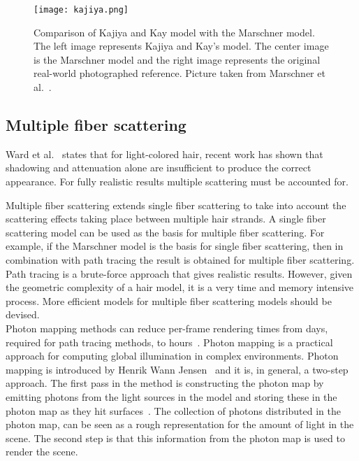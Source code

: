 \documentclass[11pt,a4paper]{report}
\begin{document}
\begin{figure}
\begin{center}
\texttt{[image: kajiya.png]}
\caption{Comparison of Kajiya and Kay model with the Marschner model. The left image represents Kajiya and Kay's model. The center image is the Marschner model and the right image represents the original real-world photographed reference. Picture taken from Marschner et al.~\cite{marschner}.}
\label{fig_compare_kajiya}
\end{center}
\end{figure}


\subsection{Multiple fiber scattering}

Ward et al.~\cite{ward} states that for light-colored hair, recent work has shown that shadowing and attenuation alone are insufficient to produce the correct appearance. For fully realistic results multiple scattering must be accounted for.

Multiple fiber scattering extends single fiber scattering to take into account the scattering effects taking place between multiple hair strands. A single fiber scattering model can be used as the basis for multiple fiber scattering. For example, if the Marschner model is the basis for single fiber scattering, then in combination with path tracing the result is obtained for multiple fiber scattering. Path tracing is a brute-force approach that gives realistic results. However, given the geometric complexity of a hair model, it is a very time and memory intensive process. More efficient models for multiple fiber scattering models should be devised.\\

Photon mapping methods can reduce per-frame rendering times from days, required for path tracing methods, to hours~\cite{ward}. Photon mapping is a practical approach for computing global illumination in complex environments. Photon mapping is introduced by Henrik Wann Jensen~\cite{jensen} and it is, in general, a two-step approach.
The first pass in the method is constructing the photon map by emitting photons from the light sources in the model and storing these in the photon map as they hit surfaces~\cite{jensen}. The collection of photons distributed in the photon map, can be seen as a rough representation for the amount of light in the scene. The second step is that this information from the photon map is used to render the scene.
\end{document}
